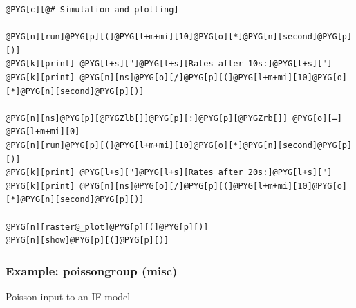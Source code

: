 \documentclass[letterpaper,10pt,english]{manual}
\begin{document}
\begin{Verbatim}[commandchars=@\[\]]
@PYG[c][@# Simulation and plotting]

@PYG[n][run]@PYG[p][(]@PYG[l+m+mi][10]@PYG[o][*]@PYG[n][second]@PYG[p][)]
@PYG[k][print] @PYG[l+s]["]@PYG[l+s][Rates after 10s:]@PYG[l+s]["]
@PYG[k][print] @PYG[n][ns]@PYG[o][/]@PYG[p][(]@PYG[l+m+mi][10]@PYG[o][*]@PYG[n][second]@PYG[p][)]

@PYG[n][ns]@PYG[p][@PYGZlb[]]@PYG[p][:]@PYG[p][@PYGZrb[]] @PYG[o][=] @PYG[l+m+mi][0]
@PYG[n][run]@PYG[p][(]@PYG[l+m+mi][10]@PYG[o][*]@PYG[n][second]@PYG[p][)]
@PYG[k][print] @PYG[l+s]["]@PYG[l+s][Rates after 20s:]@PYG[l+s]["]
@PYG[k][print] @PYG[n][ns]@PYG[o][/]@PYG[p][(]@PYG[l+m+mi][10]@PYG[o][*]@PYG[n][second]@PYG[p][)]

@PYG[n][raster@_plot]@PYG[p][(]@PYG[p][)]
@PYG[n][show]@PYG[p][(]@PYG[p][)]
\end{Verbatim}

\resetcurrentobjects
\hypertarget{--doc-examples-misc_poissongroup}{}

\hypertarget{index-61}{}\subsubsection{Example: poissongroup (misc)}

Poisson input to an IF model
\end{document}
